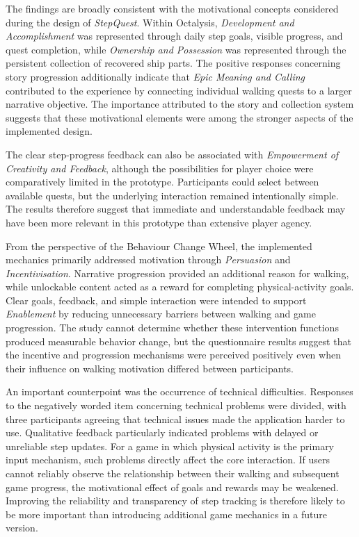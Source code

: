 The findings are broadly consistent with the motivational concepts considered during the design of \textit{StepQuest}. Within Octalysis, \textit{Development and Accomplishment} was represented through daily step goals, visible progress, and quest completion, while \textit{Ownership and Possession} was represented through the persistent collection of recovered ship parts. The positive responses concerning story progression additionally indicate that \textit{Epic Meaning and Calling} contributed to the experience by connecting individual walking quests to a larger narrative objective. The importance attributed to the story and collection system suggests that these motivational elements were among the stronger aspects of the implemented design.

The clear step-progress feedback can also be associated with \textit{Empowerment of Creativity and Feedback}, although the possibilities for player choice were comparatively limited in the prototype. Participants could select between available quests, but the underlying interaction remained intentionally simple. The results therefore suggest that immediate and understandable feedback may have been more relevant in this prototype than extensive player agency.

From the perspective of the Behaviour Change Wheel, the implemented mechanics primarily addressed motivation through \textit{Persuasion} and \textit{Incentivisation}. Narrative progression provided an additional reason for walking, while unlockable content acted as a reward for completing physical-activity goals. Clear goals, feedback, and simple interaction were intended to support \textit{Enablement} by reducing unnecessary barriers between walking and game progression. The study cannot determine whether these intervention functions produced measurable behavior change, but the questionnaire results suggest that the incentive and progression mechanisms were perceived positively even when their influence on walking motivation differed between participants.

An important counterpoint was the occurrence of technical difficulties. Responses to the negatively worded item concerning technical problems were divided, with three participants agreeing that technical issues made the application harder to use. Qualitative feedback particularly indicated problems with delayed or unreliable step updates. For a game in which physical activity is the primary input mechanism, such problems directly affect the core interaction. If users cannot reliably observe the relationship between their walking and subsequent game progress, the motivational effect of goals and rewards may be weakened. Improving the reliability and transparency of step tracking is therefore likely to be more important than introducing additional game mechanics in a future version.

